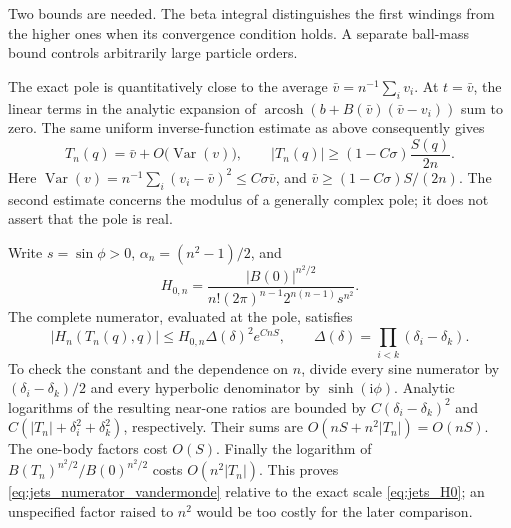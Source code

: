 \documentclass[11pt]{article}
\numberwithin{equation}{section}
\theoremstyle{definition}
\newcommand{\ii}{\mathrm i}
\begin{document}
Two bounds are needed. The beta integral distinguishes the first
windings from the higher ones when its convergence condition holds.
A separate ball-mass bound controls arbitrarily large particle orders.

The exact pole is quantitatively close to the average
$\bar v=n^{-1}\sum_i v_i$. At $t=\bar v$, the linear terms in the
analytic expansion of
$\operatorname{arcosh}(b+B(\bar v)(\bar v-v_i))$ sum to zero.
The same uniform inverse-function estimate as above consequently gives
\begin{equation}\label{eq:jets_pole_lower}
 T_n(q)=\bar v+O\bigl(\operatorname{Var}(v)\bigr),\qquad
 |T_n(q)|\ge (1-C\sigma)\frac{S(q)}{2n}.
\end{equation}
Here $\operatorname{Var}(v)=n^{-1}\sum_i(v_i-\bar v)^2\le
C\sigma\bar v$, and
$\bar v\ge (1-C\sigma)S/(2n)$. The second estimate concerns the
modulus of a generally complex pole; it does not assert that the
pole is real.

Write $s=\sin\phi>0$, $\alpha_n=(n^2-1)/2$, and
\begin{equation}\label{eq:jets_H0}
 H_{0,n}=\frac{|B(0)|^{n^2/2}}
 {n!(2\pi)^{n-1}2^{n(n-1)}s^{n^2}}.
\end{equation}
The complete numerator, evaluated at the pole, satisfies
\begin{equation}\label{eq:jets_numerator_vandermonde}
 |H_n(T_n(q),q)|\le H_{0,n}\Delta(\delta)^2 e^{CnS},
 \qquad \Delta(\delta)=\prod_{i<k}(\delta_i-\delta_k).
\end{equation}
To check the constant and the dependence on $n$, divide every sine
numerator by $(\delta_i-\delta_k)/2$ and every hyperbolic
denominator by $\sinh(\ii\phi)$. Analytic logarithms of the
resulting near-one ratios are bounded by
$C(\delta_i-\delta_k)^2$ and
$C(|T_n|+\delta_i^2+\delta_k^2)$, respectively. Their sums are
$O(nS+n^2|T_n|)=O(nS)$. The one-body factors cost $O(S)$.
Finally the logarithm of
$B(T_n)^{n^2/2}/B(0)^{n^2/2}$ costs $O(n^2|T_n|)$.
This proves \eqref{eq:jets_numerator_vandermonde} relative to the exact
scale \eqref{eq:jets_H0}; an unspecified factor raised to $n^2$ would
be too costly for the later comparison.
\end{document}
